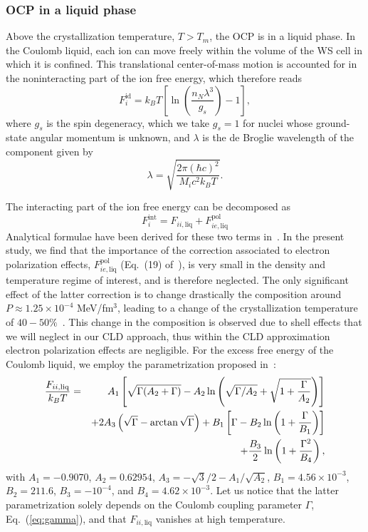 \subsubsection{OCP in a liquid phase}

Above the crystallization temperature, $T > T_m$, the OCP is in a liquid phase.
In the Coulomb liquid, each ion can move freely within the volume of the WS 
cell in which it is confined. This translational center-of-mass motion is
accounted for in the noninteracting part of the ion free energy, which
therefore reads~\cite{Haensel2007}
%
\begin{equation}
  F_i^{\text{id}} = k_B T 
  \left[\ln\left(\frac{n_N\lambda^3}{g_s}\right) - 1\right]\label{eq:fliqid},
\end{equation}
%
where $g_s$ is the spin degeneracy, which we take $g_s=1$ for nuclei whose
ground-state angular momentum is unknown, and $\lambda$ is the de Broglie
wavelength of the component given by
%
\begin{equation}
  \lambda = \sqrt{\frac{2\pi(\hbar c)^2}{M_{i}c^2 k_B T}}.
\end{equation}
%

The interacting part of the ion free energy can be decomposed
as~\cite{Fantina2020}
%
\begin{equation}
  F_i^{\text{int}} = F_{ii,\text{liq}} +
  F_{ie,\text{liq}}^{\text{pol}}\label{eq:fiintliq}
\end{equation}
%
Analytical formulae have been derived for these two terms 
in~\cite{Potekhin2000}.
In the present study, we find that the importance of the correction
associated to electron polarization effects, 
$F_{ie,\text{liq}}^{\text{pol}}$ (Eq.~(19) of~\cite{Potekhin2000}), is very 
small in the density and temperature regime of interest, and is therefore 
neglected. 
%
{The only significant effect of the latter correction is to change
drastically the composition around $P\approx 1.25\times 10^{-4}$ MeV/fm$^3$,
leading to a change of the crystallization temperature of
$40-50\%$~\cite{Fantina2020}. This
change in the composition is observed due to shell effects that we will 
neglect in our CLD approach, thus within the CLD approximation electron 
polarization effects are negligible.}
%
For the {excess free energy of the Coulomb liquid}, we employ the 
parametrization proposed in~\cite{Potekhin2000}: 
%
\begin{eqnarray}
  \frac{F_{ii,\text{liq}}}{k_B T} 
  &=& A_1\left[\sqrt{\Gamma(A_2+\Gamma)} - A_2\ln\left(\sqrt{\Gamma/A_2} 
+ \sqrt{1+\frac{\Gamma}{A_2}}\right)\right]\notag\\
  &&+ 2A_3\left(\sqrt{\Gamma} - \arctan\sqrt{\Gamma}\right) 
  + B_1\left[\Gamma-B_2\ln\left(1+\frac{\Gamma}{B_1}\right)\right]\notag\\
  &&+ \frac{B_3}{2}\ln\left(1+\frac{\Gamma^2}{B_4}\right),
\end{eqnarray}
%
with $A_1=-0.9070$, $A_2=0.62954$, $A_3=-\sqrt{3}/2-A_1/\sqrt{A_2}$,
$B_1=4.56\times 10^{-3}$, $B_2=211.6$, $B_3=-10^{-4}$, and $B_4=4.62\times
10^{-3}$. Let us notice that the latter parametrization 
solely depends on the Coulomb coupling parameter $\Gamma$, 
Eq.~(\ref{eq:gamma}), and that $F_{ii,\text{liq}}$ vanishes at high 
temperature.

